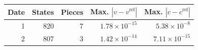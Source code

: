 \begin{tabular}{rrrrr}
\toprule
Date & States & Pieces & Max. $|v-v^{\mathrm{ref}}|$ & Max. $|c-c^{\mathrm{ref}}|$ \\
\midrule
1 & 820 & 7 & $1.78\times10^{-15}$ & $5.38\times10^{-8}$ \\
2 & 807 & 3 & $1.42\times10^{-14}$ & $7.11\times10^{-15}$ \\
\bottomrule
\end{tabular}
